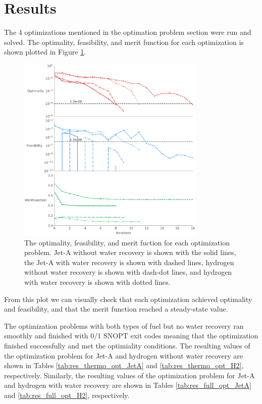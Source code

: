 \documentclass[conf]{new-aiaa}
\begin{document}
\section{Results}
\label{sec:results}
The 4 optimizations mentioned in the optimation problem section were run and solved.
The optimality, feasibility, and merit function for each optimization is shown plotted in Figure \ref{fig:history_clvr}.


\begin{figure}[hbt!]
    \centering
    \includegraphics[width=0.8\textwidth]{opt_summary.pdf}
    \caption{The optimality, feasibility, and merit fuction for each optimization problem.
        Jet-A without water recovery is shown with the solid lines, the Jet-A with water recovery is shown with dashed lines, hydrogen without water recovery is shown with dash-dot lines, and hydrogen with water recovery is shown with dotted lines.}
    \label{fig:history_clvr}
\end{figure}

From this plot we can visually check that each optimization achieved optimality and feasibility, and that the merit function reached a steady-state value.


The optimization problems with both types of fuel but no water recovery ran smoothly and finished with 0/1 SNOPT exit codes meaning that the optimization finished successfully and met the optimiality conditions.
The resulting values of the optimization problem for Jet-A and hydrogen without water recovery are shown in Tables \ref{tab:res_thermo_opt_JetA} and \ref{tab:res_thermo_opt_H2}, respectively.
Similarly, the resulting values of the optimization problem for Jet-A and hydrogen with water recovery are shown in Tables \ref{tab:res_full_opt_JetA} and \ref{tab:res_full_opt_H2}, respectively.
\end{document}
